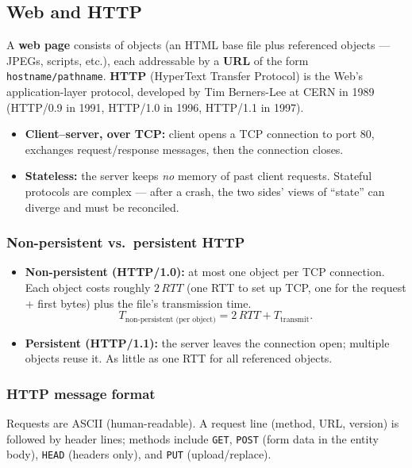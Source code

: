 \documentclass[hidelinks]{article}
\begin{document}
\subsection{Web and HTTP}

A \textbf{web page} consists of objects (an HTML base file plus referenced
objects --- JPEGs, scripts, etc.), each addressable by a \textbf{URL} of the
form \texttt{host\-name/path\-name}. \textbf{HTTP} (HyperText Transfer
Protocol) is the Web's application-layer protocol, developed by Tim
Berners-Lee at CERN in 1989 (HTTP/0.9 in 1991, HTTP/1.0 in 1996, HTTP/1.1 in
1997).

\begin{itemize}
    \item \textbf{Client--server, over TCP:} client opens a TCP connection to
    port 80, exchanges request/response messages, then the connection closes.
    \item \textbf{Stateless:} the server keeps \emph{no} memory of past client
    requests. Stateful protocols are complex --- after a crash, the two sides'
    views of ``state'' can diverge and must be reconciled.
\end{itemize}

\subsubsection{Non-persistent vs.\ persistent HTTP}
\begin{itemize}
    \item \textbf{Non-persistent (HTTP/1.0):} at most one object per TCP
    connection. Each object costs roughly $2\,RTT$ (one RTT to set up TCP,
    one for the request + first bytes) plus the file's transmission time.
    \[
        T_{\text{non-persistent (per object)}} = 2\,RTT + T_{\text{transmit}}.
    \]
    \item \textbf{Persistent (HTTP/1.1):} the server leaves the connection
    open; multiple objects reuse it. As little as one RTT for all referenced
    objects.
\end{itemize}

\subsubsection{HTTP message format}
Requests are ASCII (human-readable). A request line (method, URL, version)
is followed by header lines; methods include \texttt{GET}, \texttt{POST}
(form data in the entity body), \texttt{HEAD} (headers only), and
\texttt{PUT} (upload/replace).
\end{document}
